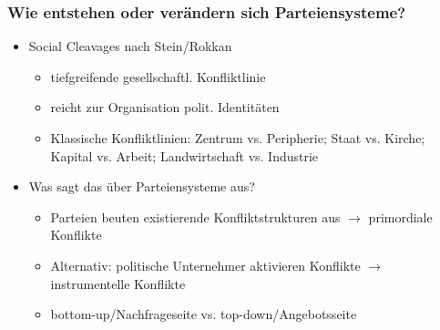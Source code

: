 \documentclass{beamer}
\begin{document}
\begin{frame}
    \frametitle{Wie entstehen oder verändern sich Parteiensysteme?}
    \begin{itemize}
        \item Social Cleavages nach Stein/Rokkan
        \begin{itemize}
            \item tiefgreifende gesellschaftl. Konfliktlinie
            \item reicht zur Organisation polit. Identitäten
            \item Klassische Konfliktlinien: Zentrum vs. Peripherie;
                Staat vs. Kirche; Kapital vs. Arbeit; Landwirtschaft
                vs. Industrie
        \end{itemize}
        \item Was sagt das über Parteiensysteme aus?
        \begin{itemize}
            \item Parteien beuten existierende Konfliktstrukturen aus\newline
            $\rightarrow$ primordiale Konflikte
            \item Alternativ: politische Unternehmer aktivieren Konflikte\newline
            $\rightarrow$ instrumentelle Konflikte
            \item bottom-up/Nachfrageseite vs. top-down/Angebotsseite
        \end{itemize}


    \end{itemize}
\end{frame}
\end{document}
